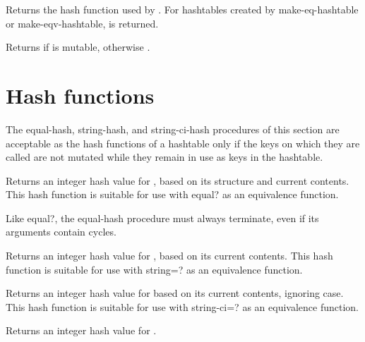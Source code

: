 \begin{entry}{}

Returns the hash function used by .
For hashtables created by {\cf make-eq-hashtable} 
or {\cf make-\hp{}eqv-\hp{}hashtable}, \schfalse{} is returned.
\end{entry}

\begin{entry}{}

Returns \schtrue{} if  is mutable, otherwise \schfalse{}.
\end{entry}

\section{Hash functions}

The {\cf equal-hash}, {\cf string-hash}, and {\cf string-ci-hash}
procedures of this section are acceptable as the hash functions of
a hashtable only if the keys on which they are called are not mutated
while they remain in use as keys in the hashtable.

\begin{entry}{}

Returns an integer hash value for , based on
its structure and current contents.  This hash function is suitable
for use with {\cf equal?} as an equivalence function.

\begin{note}
  Like {\cf equal?}, the {\cf equal-hash} procedure must always
  terminate, even if its arguments contain cycles.
\end{note}
\end{entry}

\begin{entry}{}

Returns an integer hash value for , based on
its current contents.
This hash function is suitable
for use with {\cf string=?} as an equivalence function.
\end{entry}

\begin{entry}{}

Returns an integer hash value for  based on
its current contents, ignoring case.
This hash function is suitable
for use with {\cf string-ci=?} as an equivalence function.
\end{entry}

\begin{entry}{}

Returns an integer hash value for .
\end{entry}

